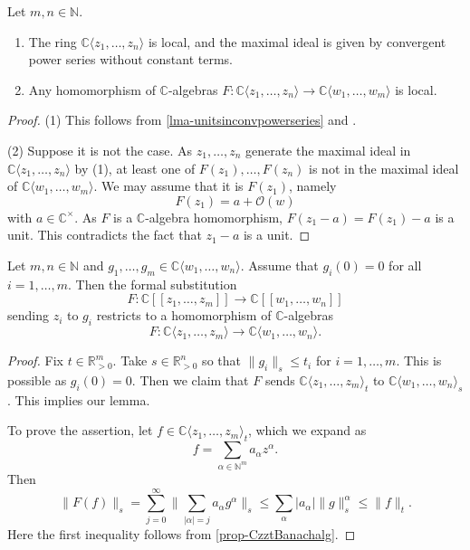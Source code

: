 \begin{theorem}\label{thm-converinglocal}
    Let $m, n\in \mathbb{N}$.
\begin{enumerate}
    \item The ring $\mathbb{C}\langle z_1,\ldots,z_n \rangle$ is local, and the maximal ideal is given by convergent power series without constant terms.
    \item Any homomorphism of $\mathbb{C}$-algebras $F:\mathbb{C}\langle z_1,\ldots,z_n \rangle\rightarrow \mathbb{C}\langle w_1,\ldots,w_m \rangle$ is local.
\end{enumerate}


\end{theorem}
\begin{proof}
(1) This follows from \cref{lma-unitsinconvpowerseries} and \cite[\href{https://stacks.math.columbia.edu/tag/00E9}{Tag 00E9}]{stacks-project}.

(2) Suppose it is not the case. As $z_1,\ldots,z_n$ generate the maximal ideal in $\mathbb{C}\langle z_1,\ldots,z_n \rangle$ by (1), at least one of $F(z_1),\ldots,F(z_n)$ is not in the maximal ideal of  $\mathbb{C}\langle w_1,\ldots,w_m \rangle$. We may assume that it is $F(z_1)$, namely
\[
    F(z_1)=a+\mathcal{O}(w)  
\]
with $a\in \mathbb{C}^{\times}$. As $F$ is a $\mathbb{C}$-algebra homomorphism, $F(z_1-a)=F(z_1)-a$ is a unit. This contradicts the fact that $z_1-a$ is a unit.
\end{proof}




\begin{lemma}\label{lma-univerpropconvspecialcase}
    Let $m,n\in \mathbb{N}$ and $g_1,\ldots,g_m\in \mathbb{C}\langle w_1,\ldots,w_n\rangle$. Assume that $g_i(0)=0$ for all $i=1,\ldots,m$. 
    Then the formal substitution 
    \[
        F:\mathbb{C}[[z_1,\ldots,z_m]]\rightarrow \mathbb{C}[[w_1,\ldots,w_n]]
    \]
    sending $z_i$ to $g_i$ restricts to a homomorphism of $\mathbb{C}$-algebras
    \[
        F:  \mathbb{C}\langle z_1,\ldots,z_m\rangle\rightarrow  \mathbb{C}\langle w_1,\ldots,w_n\rangle.
    \]
\end{lemma}
\begin{proof}
    Fix $t\in \mathbb{R}^m_{>0}$. Take $s\in \mathbb{R}^n_{>0}$ so that $\|g_i\|_s\leq t_i$ for $i=1,\ldots,m$. This is possible as $g_i(0)=0$.
    Then we claim that $F$ sends $\mathbb{C}\langle z_1,\ldots,z_m \rangle_t$ to $\mathbb{C}\langle w_1,\ldots,w_n\rangle_s$. This implies our lemma.

    To prove the assertion, let $f\in \mathbb{C}\langle z_1,\ldots,z_m \rangle_t$, which we expand as
    \[
        f=\sum_{\alpha\in \mathbb{N}^m} a_{\alpha}z^{\alpha}.
    \]
    Then
    \[
        \|F(f)\|_s=\sum_{j=0}^{\infty}\|\sum_{|\alpha|=j}a_{\alpha}g^{\alpha}\|_s\leq \sum_{\alpha}|a_{\alpha}|\|g\|_s^{\alpha}\leq \|f\|_t.
    \]
    Here the first inequality follows from \cref{prop-CzztBanachalg}.
\end{proof}

